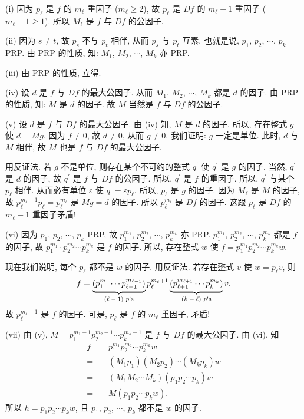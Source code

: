 \begin{pf}
    (i) 因为 $p_\ell$ 是 $f$ 的 $m_\ell$ 重因子 ($m_\ell \geq 2$), 故 $p_\ell$ 是 $Df$ 的 $m_\ell - 1$ 重因子 ($m_\ell - 1 \geq 1$). 所以 $M_\ell$ 是 $f$ 与 $Df$ 的公因子.

    (ii) 因为 $s \neq t$, 故 $p_s$ 不与 $p_t$ 相伴, 从而 $p_s$ 与 $p_t$ 互素. 也就是说, $p_1$, $p_2$, $\cdots$, $p_k$ PRP. 由 PRP 的性质, 知: $M_1$, $M_2$, $\cdots$, $M_k$ 亦 PRP.

    (iii) 由 PRP 的性质, 立得.

    (iv) 设 $d$ 是 $f$ 与 $Df$ 的最大公因子. 从而 $M_1$, $M_2$, $\cdots$, $M_k$ 都是 $d$ 的因子. 由 PRP 的性质, 知: $M$ 是 $d$ 的因子. 故 $M$ 当然是 $f$ 与 $Df$ 的公因子.

    (v) 设 $d$ 是 $f$ 与 $Df$ 的最大公因子. 由 (iv) 知, $M$ 是 $d$ 的因子. 所以, 存在整式 $g$ 使 $d = Mg$. 因为 $f \neq 0$, 故 $d \neq 0$, 从而 $g \neq 0$. 我们证明: $g$ 一定是单位. 此时, $d$ 与 $M$ 相伴, 故 $M$ 也是 $f$ 与 $Df$ 的最大公因子.

    用反证法. 若 $g$ 不是单位, 则存在某个不可约的整式 $q^{\prime}$ 使 $q^{\prime}$ 是 $g$ 的因子. 当然, $q^{\prime}$ 是 $d$ 的因子, 故 $q^{\prime}$ 是 $f$ 与 $Df$ 的公因子. 所以, $q^{\prime}$ 是 $f$ 的重因子. 所以, $q^{\prime}$ 与某个 $p_{\ell}$ 相伴. 从而必有单位 $\varepsilon$ 使 $q^{\prime} = \varepsilon p_{\ell}$. 所以, $p_{\ell}$ 是 $g$ 的因子. 因为 $M_\ell$ 是 $M$ 的因子, 故 $p_{\ell}^{m_\ell - 1} p_{\ell} = p_{\ell}^{m_\ell}$ 是 $Mg = d$ 的因子. 所以 $p_{\ell}^{m_\ell}$ 是 $Df$ 的因子. 这跟 $p_\ell$ 是 $Df$ 的 $m_\ell - 1$ 重因子矛盾!

    (vi) 因为 $p_1$, $p_2$, $\cdots$, $p_k$ PRP, 故 $p_1^{m_1}$, $p_2^{m_2}$, $\cdots$, $p_k^{m_k}$ 亦 PRP. $p_1^{m_1}$, $p_2^{m_2}$, $\cdots$, $p_k^{m_k}$ 都是 $f$ 的因子, 故 $p_1^{m_1} \cdot p_2^{m_2} \cdots p_k^{m_k}$ 是 $f$ 的因子. 所以, 存在整式 $w$ 使 $f = p_1^{m_1} p_2^{m_2} \cdots p_k^{m_k} w$.

    现在我们说明, 每个 $p_\ell$ 都不是 $w$ 的因子. 用反证法. 若存在整式 $v$ 使 $w = p_\ell v$, 则
    \begin{align*}
        f = \underbrace{(p_1^{m_1} \cdots p_{\ell-1}^{m_{\ell-1}})}_{\text{$(\ell - 1)$ $p$\apostrophe s}} p_{\ell}^{m_\ell + 1} \underbrace{(p_{\ell+1}^{m_{\ell + 1}} \cdots p_k^{m_k})}_{\text{$(k-\ell)$ $p$\apostrophe s}} v.
    \end{align*}
    故 $p_{\ell}^{m_\ell + 1}$ 是 $f$ 的因子. 可是, $p_\ell$ 是 $f$ 的 $m_\ell$ 重因子, 矛盾!

    (vii) 由 (v), $M = p_1^{m_1 - 1} p_2^{m_2 - 1} \cdots p_k^{m_k - 1}$ 是 $f$ 与 $Df$ 的最大公因子. 由 (vi), 知
    \begin{align*}
        f
        = {} & p_1^{m_1} p_2^{m_2} \cdots p_k^{m_k} w      \\
        = {} & (M_1 p_1) (M_2 p_2) \cdots (M_k p_k) w      \\
        = {} & (M_1 M_2 \cdots M_k) (p_1 p_2 \cdots p_k) w \\
        = {} & M (p_1 p_2 \cdots p_k w).
    \end{align*}
    所以 $h = p_1 p_2 \cdots p_k w$, 且 $p_1$, $p_2$, $\cdots$, $p_k$ 都不是 $w$ 的因子.


\end{pf}
